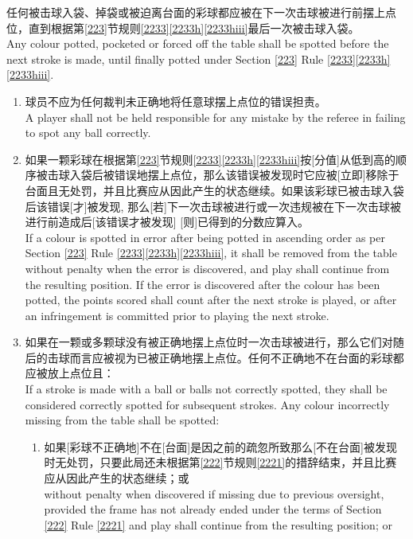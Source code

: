 \noindent 任何被击球入袋、掉袋或被迫离台面的彩球都应被在下一次击球被进行前摆上点位，直到根据第\ref{223}节规则\ref{2233}\ref{2233h}\ref{2233hiii}最后一次被击球入袋。\\
Any colour potted, pocketed or forced off the table shall be spotted before the next stroke is made, until finally potted under Section \ref{223} Rule \ref{2233}\ref{2233h}\ref{2233hiii}.
\begin{enumerate}[label=(\alph*)]
    \item 球员不应为任何裁判未正确地将任意球摆上点位的错误担责。\\
    A player shall not be held responsible for any mistake by the referee in failing to spot any ball correctly.
    \item 如果一颗彩球在根据第\ref{223}节规则\ref{2233}\ref{2233h}\ref{2233hiii}按[分值]从低到高的顺序被击球入袋后被错误地摆上点位，那么该错误被发现时它应被[立即]移除于台面且无处罚，并且比赛应从因此产生的状态继续。如果该彩球已被击球入袋后该错误[才]被发现, 那么[若]下一次击球被进行或一次违规被在下一次击球被进行前造成后[该错误才被发现] [则]已得到的分数应算入。\\
    If a colour is spotted in error after being potted in ascending order as per Section \ref{223} Rule \ref{2233}\ref{2233h}\ref{2233hiii}, it shall be removed from the table without penalty when the error is discovered, and play shall continue from the resulting position. If the error is discovered after the colour has been potted, the points scored shall count after the next stroke is played, or after an infringement is committed prior to playing the next stroke.
    \item \label{2237c}如果在一颗或多颗球没有被正确地摆上点位时一次击球被进行，那么它们对随后的击球而言应被视为已被正确地摆上点位。任何不正确地不在台面的彩球都应被放上点位且：\\
    If a stroke is made with a ball or balls not correctly spotted, they shall be considered correctly spotted for subsequent strokes. Any colour incorrectly missing from the table shall be spotted:
    \begin{enumerate}[label=(\roman*)]
        \item 如果[彩球不正确地]不在[台面]是因之前的疏忽所致那么[不在台面]被发现时无处罚，只要此局还未根据第\ref{222}节规则\ref{2221}的措辞结束，并且比赛应从因此产生的状态继续；或\\
        without penalty when discovered if missing due to previous oversight, provided the frame has not already ended under the terms of Section \ref{222} Rule \ref{2221} and play shall continue from the resulting position; or

\end{enumerate}
\end{enumerate}
